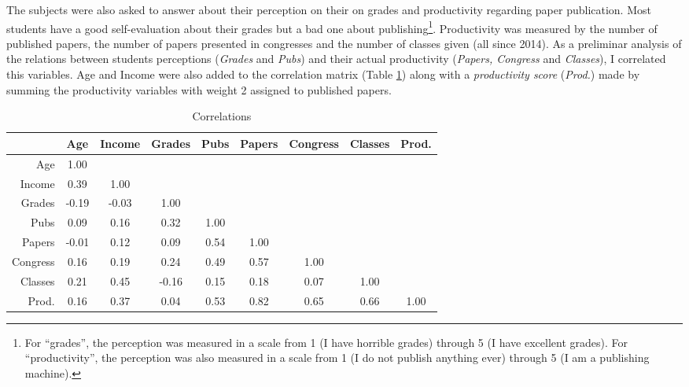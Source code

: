 \documentclass[12pt, english]{article}
\begin{document}
The subjects were also asked to answer about their perception on their on grades and productivity regarding paper publication. Most students have a good self-evaluation about their grades but a bad one about publishing\footnote{For ``grades'', the perception was measured in a scale from 1 (I have horrible grades) through 5 (I have excellent grades). For ``productivity'', the perception was also measured in a scale from 1 (I do not publish anything ever) through 5 (I am a publishing machine).}. Productivity was measured by the number of published papers, the number of papers presented in congresses and the number of classes given (all since 2014). As a preliminar analysis of the relations between students perceptions (\textit{Grades} and \textit{Pubs}) and their actual productivity (\textit{Papers, Congress} and \textit{Classes}), I correlated this variables. Age and Income were also added to the correlation matrix (Table \ref{correlations}) along with a \textit{productivity score} (\textit{Prod.}) made by summing the productivity variables with weight 2 assigned to published papers.




	

\begin{table}[ht]

		\centering
		\caption{Correlations}
		\label{correlations}
	
	\begin{tabular}{r|cccccccc}
			\hline
			& Age & Income & Grades & Pubs & Papers & Congress & Classes & Prod. \\ 
			\hline
			Age & 1.00 &  &  &  &  &  &  &  \\ 
			Income & 0.39 & 1.00 &  &  &  &  &  &  \\ 
			Grades & -0.19 & -0.03 & 1.00 &  &  &  &  &  \\ 
			Pubs & 0.09 & 0.16 & 0.32 & 1.00 &  &  &  &  \\ 
			Papers & -0.01 & 0.12 & 0.09 & 0.54 & 1.00 &  &  &  \\ 
			Congress & 0.16 & 0.19 & 0.24 & 0.49 & 0.57 & 1.00 &  &  \\ 
			Classes & 0.21 & 0.45 & -0.16 & 0.15 & 0.18 & 0.07 & 1.00 &  \\ 
			Prod. & 0.16 & 0.37 & 0.04 & 0.53 & 0.82 & 0.65 & 0.66 & 1.00 \\ 
			\hline
		\end{tabular}
	
	
\end{table}
\end{document}
